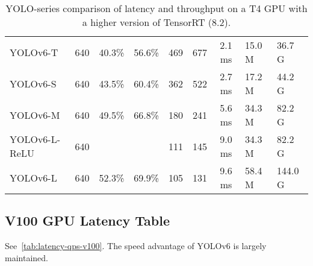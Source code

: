 \documentclass[10pt,twocolumn,letterpaper]{article}
\begin{document}
\begin{table}[ht]
{\begin{tabular}{l|HHHc|c|cHH}
      YOLOv6-T & 640 & 40.3\% & 56.6\% & 469 & 677 & 2.1 ms & 15.0 M & 36.7 G \\
      YOLOv6-S & 640 & 43.5\% & 60.4\% & 362 & 522 & 2.7 ms & 17.2 M & 44.2 G \\
      YOLOv6-M & 640 & 49.5\% & 66.8\%& 180 & 241 & 5.6 ms & 34.3 M & 82.2 G \\
      YOLOv6-L-ReLU & 640 &  & & 111 & 145 & 9.0 ms & 34.3 M & 82.2 G \\
      YOLOv6-L & 640 & 52.3\% & 69.9\% & 105  & 131 & 9.6 ms & 58.4 M & 144.0 G \\
      \bottomrule
		\end{tabular}
	}
	\caption{
    YOLO-series comparison of latency and throughput on a T4 GPU with a higher version of TensorRT (8.2).
	}
	\label{tab:latency-qps-trt82}
\end{table}

\subsection{V100 GPU Latency Table}
See~\cref{tab:latency-qps-v100}. The speed advantage of YOLOv6 is largely maintained.
\end{document}
